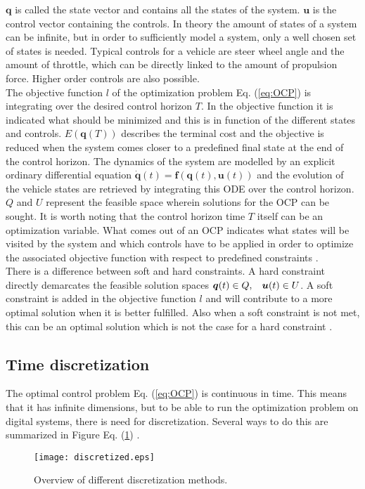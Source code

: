 $\bm{q}$ is called the state vector and contains all the states of the system. $\bm{u}$ is the control vector containing the controls. In theory the amount of states of a system can be infinite, but in order to sufficiently model a system, only a well chosen set of states is needed. Typical controls for a vehicle are steer wheel angle and the amount of throttle, which can be directly linked to the amount of propulsion force. Higher order controls are also possible.\\
The objective function $l$ of the optimization problem Eq. (\ref{eq:OCP}) is integrating over the desired control horizon $T$. In the objective function it is indicated what should be minimized and this is in function of the different states and controls. $E(\bm{q}(T))$ describes the terminal cost and the objective is reduced when the system comes closer to a predefined final state at the end of the control horizon.
The dynamics of the system are modelled by an explicit ordinary differential equation $\bm{\dot{q}}(t) = \bm{f}(\bm{q}(t), \bm{u}(t))$ and the evolution of the vehicle states are retrieved by integrating this ODE over the control horizon.
$Q$ and $U$ represent the feasible space wherein solutions for the OCP can be sought. It is worth noting that the control horizon time $T$ itself can be an optimization variable. What comes out of an OCP indicates what states will be visited by the system and which controls have to be applied in order to optimize the associated objective function with respect to predefined constraints \cite{Panos_opti}.\\ 

There is a difference between soft and hard constraints. A hard constraint directly demarcates the feasible solution spaces $\bm{q}(t)\in Q,\hspace{3 mm} \bm{u}(t)\in U$. A soft constraint is added in the objective function $l$ and will contribute to a more optimal solution when it is better fulfilled. Also when a soft constraint is not met, this can be an optimal solution which is not the case for a hard constraint \cite{Yankov}. \\

\subsection{Time discretization}
\label{s:time_dis}
The optimal control problem Eq. (\ref{eq:OCP}) is continuous in time. This means that it has infinite dimensions, but to be able to run the optimization problem on digital systems, there is need for discretization. Several ways to do this are summarized in Figure Eq. (\ref{fig:discretization_m}) \cite{Gillis2019}.
\begin{figure}[htp]
	\centering
	\texttt{[image: discretized.eps]}
	\caption{Overview of different discretization methods.}
	\label{fig:discretization_m}
\end{figure}

